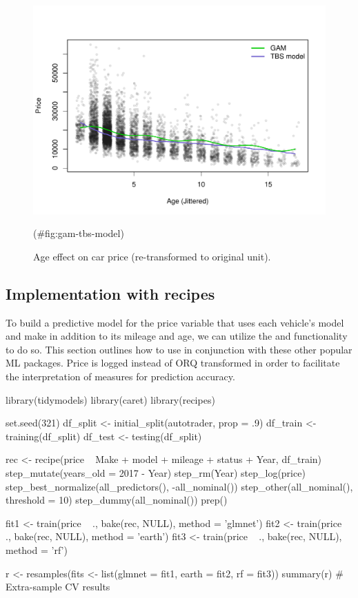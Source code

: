 \begin{Schunk}
\begin{figure}

{\centering \includegraphics[width=0.8\linewidth]{figs/gam-tbs-model-1} 

}

\caption[Age effect on car price (re-transformed to original unit)]{Age effect on car price (re-transformed to original unit).}(\#fig:gam-tbs-model)
\end{figure}
\end{Schunk}

\hypertarget{implementation-with-recipes}{%
\subsection{Implementation with
recipes}\label{implementation-with-recipes}}

To build a predictive model for the price variable that uses each
vehicle's model and make in addition to its mileage and age, we can
utilize the  and  functionality to do so. This
section outlines how to use  in conjunction with
these other popular ML packages. Price is logged instead of ORQ
transformed in order to facilitate the interpretation of measures for
prediction accuracy.

\begin{Schunk}
\begin{Sinput}
library(tidymodels)
library(caret)
library(recipes)

set.seed(321)
df_split <- initial_split(autotrader, prop = .9)
df_train <- training(df_split)
df_test <- testing(df_split)

rec <- recipe(price ~ Make + model +  mileage + status + Year, df_train) %
  step_mutate(years_old = 2017 - Year) %
  step_rm(Year) %
  step_log(price) %
  step_best_normalize(all_predictors(), -all_nominal()) %
  step_other(all_nominal(), threshold = 10) %
  step_dummy(all_nominal()) %
  prep()

fit1 <- train(price ~ ., bake(rec, NULL), method = 'glmnet')
fit2 <- train(price ~ ., bake(rec, NULL), method = 'earth')
fit3 <- train(price ~ ., bake(rec, NULL), method = 'rf')

r <- resamples(fits <- list(glmnet = fit1, earth = fit2, rf = fit3))
summary(r) # Extra-sample CV results
\end{Sinput}
\end{Schunk}

